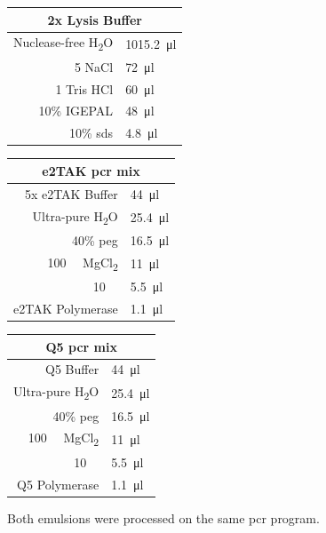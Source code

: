 \begin{appendix}
\begin{multicols}{2}
\begin{center}
\begin{tabular}{r|l}
	\multicolumn{2}{c}{2x Lysis Buffer} \\
	\hline
	Nuclease-free H\textsubscript{2}O & \SI{1015.2}{\ul} \\
	\SI{5}{\molar} NaCl & \SI{72}{\ul} \\
	\SI{1}{\molar} Tris HCl  & \SI{60}{\ul} \\
	10\% IGEPAL & \SI{48}{\ul} \\
	10\% \acrshort{sds} & \SI{4.8}{\ul} \\
\end{tabular}
\end{center}
\medskip

\begin{center}
\begin{tabular}{r|l}
	\multicolumn{2}{c}{e2TAK \acrshort{pcr} mix} \\
	\hline
	5x e2TAK Buffer & \SI{44}{\ul} \\
	Ultra-pure H\textsubscript{2}O & \SI{25.4}{\ul}  \\
	40\% \acrshort{peg} & \SI{16.5}{\ul} \\
	\SI{100}{\milli\molar} MgCl\textsubscript{2} & \SI{11}{\ul} \\
	\SI{10}{\milli\molar} \acrshortpl{dntp}  & \SI{5.5}{\ul} \\
	e2TAK Polymerase & \SI{1.1}{\ul} \\
\end{tabular}
\end{center}
\medskip

\begin{center}
\begin{tabular}{r|l}
	\multicolumn{2}{c}{Q5 \acrshort{pcr} mix} \\
	\hline
	Q5 Buffer & \SI{44}{\ul} \\
	Ultra-pure H\textsubscript{2}O & \SI{25.4}{\ul}  \\
	40\% \acrshort{peg} & \SI{16.5}{\ul} \\
	\SI{100}{\milli\molar} MgCl\textsubscript{2} & \SI{11}{\ul} \\
	\SI{10}{\milli\molar} \acrshortpl{dntp}  & \SI{5.5}{\ul} \\
	Q5 Polymerase & \SI{1.1}{\ul} \\
\end{tabular}
\end{center}
\medskip

Both emulsions were processed on the same \acrshort{pcr} program.\pms


\end{multicols}
\end{appendix}
